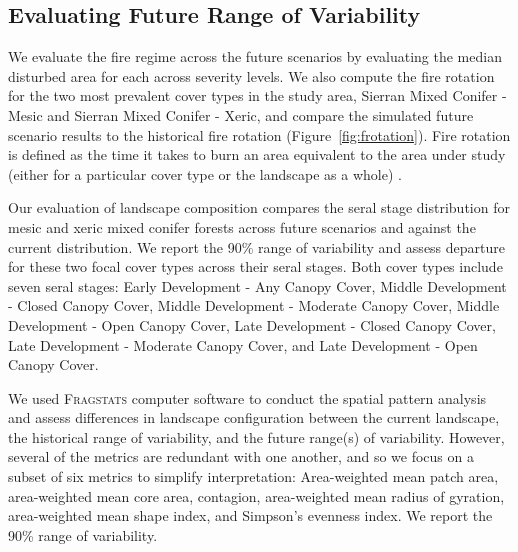 \subsection*{Evaluating Future Range of Variability}
We evaluate the fire regime across the future scenarios by evaluating the median disturbed area for each across severity levels. %
We also compute the fire rotation for the two most prevalent cover types in the study area, Sierran Mixed Conifer - Mesic and Sierran Mixed Conifer - Xeric, and compare the simulated future scenario results to the historical fire rotation (Figure~\ref{fig:frotation}). Fire rotation is defined as the time it takes to burn an area equivalent to the area under study (either for a particular cover type or the landscape as a whole) \citep{Agee1993}.%
%


Our evaluation of landscape composition compares the seral stage distribution for mesic and xeric mixed conifer forests across future scenarios and against the current distribution. We report the 90\% range of variability and assess departure for these two focal cover types across their seral stages. Both cover types include seven seral stages: Early Development - Any Canopy Cover, Middle Development - Closed Canopy Cover, Middle Development - Moderate Canopy Cover, Middle Development - Open Canopy Cover, Late Development - Closed Canopy Cover, Late Development - Moderate Canopy Cover, and Late Development - Open Canopy Cover.


%
We used \textsc{Fragstats} computer software \citep{Fragstats2012} to conduct the spatial pattern analysis and assess differences in landscape configuration between the current landscape, the historical range of variability, and the future range(s) of variability. However, several of the metrics are redundant with one another, and so we focus on a subset of six metrics to simplify interpretation: Area-weighted mean patch area, area-weighted mean core area, contagion, area-weighted mean radius of gyration, area-weighted mean shape index, and Simpson's evenness index. We report the 90\% range of variability. %

